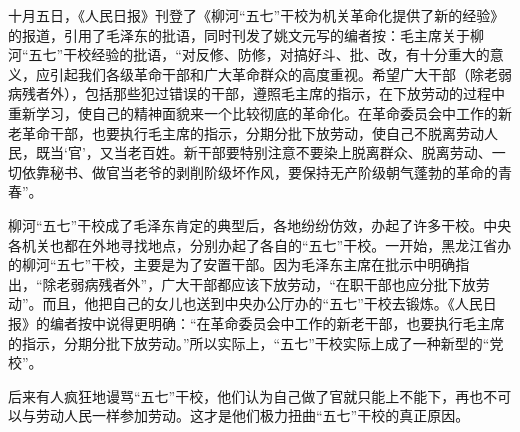 \begin{maonote}
十月五日，《人民日报》刊登了《柳河“五七”干校为机关革命化提供了新的经验》的报道，引用了毛泽东的批语，同时刊发了姚文元写的编者按：毛主席关于柳河“五七”干校经验的批语，“对反修、防修，对搞好斗、批、改，有十分重大的意义，应引起我们各级革命干部和广大革命群众的高度重视。希望广大干部（除老弱病残者外），包括那些犯过错误的干部，遵照毛主席的指示，在下放劳动的过程中重新学习，使自己的精神面貌来一个比较彻底的革命化。在革命委员会中工作的新老革命干部，也要执行毛主席的指示，分期分批下放劳动，使自己不脱离劳动人民，既当‘官’，又当老百姓。新干部要特别注意不要染上脱离群众、脱离劳动、一切依靠秘书、做官当老爷的剥削阶级坏作风，要保持无产阶级朝气蓬勃的革命的青春”。

柳河“五七”干校成了毛泽东肯定的典型后，各地纷纷仿效，办起了许多干校。中央各机关也都在外地寻找地点，分别办起了各自的“五七”干校。一开始，黑龙江省办的柳河“五七”干校，主要是为了安置干部。因为毛泽东主席在批示中明确指出，“除老弱病残者外”，广大干部都应该下放劳动，“在职干部也应分批下放劳动”。而且，他把自己的女儿也送到中央办公厅办的“五七”干校去锻炼。《人民日报》的编者按中说得更明确：“在革命委员会中工作的新老干部，也要执行毛主席的指示，分期分批下放劳动。”所以实际上，“五七”干校实际上成了一种新型的“党校”。

后来有人疯狂地谩骂“五七”干校，他们认为自己做了官就只能上不能下，再也不可以与劳动人民一样参加劳动。这才是他们极力扭曲“五七”干校的真正原因。
\end{maonote}
